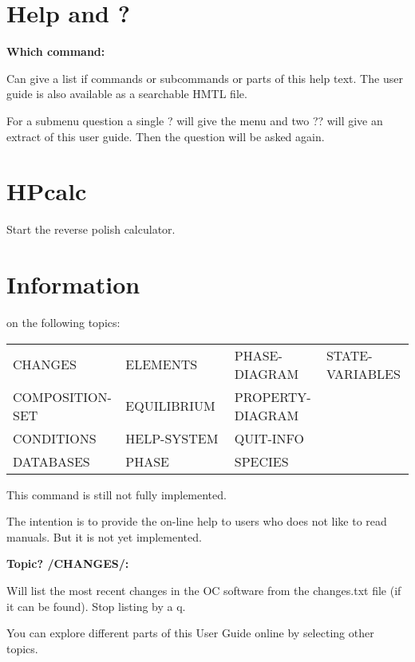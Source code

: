 \documentclass[11pt]{article}
\begin{document}
\section{Help and ?}

{\bf Which command:}

Can give a list if commands or subcommands or parts of this help text.
The user guide is also available as a searchable HMTL file.

For a submenu question a single ? will give the menu and two ?? will
give an extract of this user guide.  Then the question will be asked
again.

\section{HPcalc }

Start the reverse polish calculator.

\hypertarget{Info}{}
\hypertarget{Topic?changes}{}
\hypertarget{Topic?quit}{}
\section{Information }

on the following topics:

\begin{tabular}{llll}
 CHANGES         & ELEMENTS     & PHASE-DIAGRAM~   & STATE-VARIABLES\\ 
 COMPOSITION-SET~& EQUILIBRIUM~ & PROPERTY-DIAGRAM~\\
 CONDITIONS      & HELP-SYSTEM  & QUIT-INFO\\
 DATABASES       & PHASE        & SPECIES\\
\end{tabular}

This command is still not fully implemented.

The intention is to provide the on-line help to users who does not
like to read manuals.  But it is not yet implemented.

{\bf Topic? /CHANGES/:}

Will list the most recent changes in the OC software from the
changes.txt file (if it can be found).  Stop listing by a q.

You can explore different parts of this User Guide online by selecting
other topics.
\end{document}

